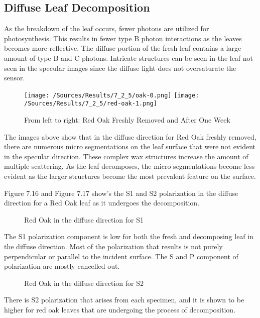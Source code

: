 \subsection{Diffuse Leaf Decomposition}
As the breakdown of the leaf occurs, fewer photons are utilized for photosynthesis.  This results in fewer type B photon interactions as the leaves becomes more reflective.  The diffuse portion of the fresh leaf contains a large amount of type B and C photons.  Intricate structures can be seen in the leaf not seen in the specular images since the diffuse light does not oversaturate the sensor.
%
\begin{figure}[htp]
    \centering
    \hspace*{\fill}%
    \texttt{[image: /Sources/Results/7\_2\_5/oak-0.png]}\hfill%
    \texttt{[image: /Sources/Results/7\_2\_5/red-oak-1.png]}
    \hspace*{\fill}%
    \caption{From left to right: Red Oak Freshly Removed and After One Week}
    \label{fig:specular-raw-decompose}
\end{figure}
%
The images above show that in the diffuse direction for Red Oak freshly removed, there are numerous micro segmentations on the leaf surface that were not evident in the specular direction.  These complex wax structures increase the amount of multiple scattering.  As the leaf decomposes, the micro segmentations become less evident as the larger structures become the most prevalent feature on the surface.

Figure 7.16 and Figure 7.17 show's the S1 and S2 polarization in the diffuse direction for a Red Oak leaf as it undergoes the decomposition.
%
\begin{figure}[!htb]
    \begin{center}
    \end{center}
    \caption{Red Oak in the diffuse direction for S1}
    \label{fig:polarization}
\end{figure}
%
The S1 polarization component is low for both the fresh and decomposing leaf in the diffuse direction.  Most of the polarization that results is not purely perpendicular or parallel to the incident surface.  The S and P component of polarization are mostly cancelled out.
%
\begin{figure}[!htb]
    \begin{center}
    \end{center}
    \caption{Red Oak in the diffuse direction for S2}
    \label{fig:polarization}
\end{figure}
%
There is S2 polarization that arises from each specimen, and it is shown to be higher for red oak leaves that are undergoing the process of decomposition.

